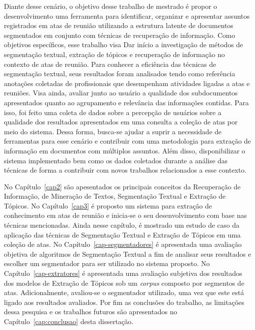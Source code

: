 
Diante desse cenário, o objetivo desse trabalho de mestrado é propor o desenvolvimento uma ferramenta para identificar, organizar e apresentar assuntos registrados em atas de reunião utilizando a estrutura latente de documentos segmentados em conjunto com técnicas de recuperação de informação. 
%
Como objetivos específicos, esse trabalho visa  
Dar início a investigação de métodos de segmentação textual, extração de tópicos e recuperação de informação no contexto de atas de reunião. Para conhecer a eficiência das técnicas de segmentação textual, seus resultados foram analisados tendo como referência anotações coletadas de profissionais que desempenham atividades ligadas a atas e reuniões.
Visa ainda, avaliar junto ao usuário a qualidade dos subdocumentos apresentados quanto ao agrupamento e relevância das informações contidas. Para isso, foi feito uma coleta de dados sobre a percepção de usuários sobre a qualidade dos resultados apresentados em uma consulta a coleção de atas por meio do sistema.
% 
Dessa forma, busca-se ajudar a suprir a necessidade de ferramentas para esse cenário e contribuir com uma metodologia para extração de informação em documentos com múltiplos assuntos. Além disso, disponibilizar o sistema implementado bem como os dados coletados durante a análise das técnicas de forma a contribuir com novos trabalhos relacionados a esse contexto.





No Capítulo~\ref{cap2} são apesentados os principais conceitos da Recuperação de Informação, de Mineração de Textos, Segmentação Textual e Extração de Tópicos.
%
No Capítulo~\ref{cap3} é proposto um sistema para extração de conhecimento em atas de reunião e inicia-se o seu desenvolvimento com base nas técnicas mencionadas. 
Ainda nesse capítulo, é mostrado um estudo de caso da aplicação das técnicas de Segmentação Textual e Extração de Tópicos em uma coleção de atas. 
%
No Capítulo~\ref{cap-segmentadores} é apresentada uma avaliação objetiva de algoritmos de Segmentação Textual a fim de analisar seus resultados e escolher um segmentador para ser utilizado no sistema proposto.
%
No Capítulo~\ref{cap-extratores} é apresentada uma avaliação subjetiva dos resultados dos modelos de Extração de Tópicos sob um \textit{corpus} composto por segmentos de atas. Adicionalmente, avaliou-se o segmentador utilizado, uma vez que este está ligado aos resultados avaliados. 
%
Por fim as conclusões do trabalho, as limitações dessa pesquisa e os trabalhos futuros são apresentados no Capítulo~\ref{cap:conclusao} desta dissertação.
















